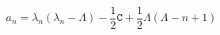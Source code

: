 \begin{equation}
	a_{n}= \lambda_{n}(\lambda_{n}-\Lambda) -\frac 12 
	\texttt{C} +\frac 12 \Lambda(\Lambda-n+1)
	\label{eq:AtypicalityCondition}
\end{equation}

